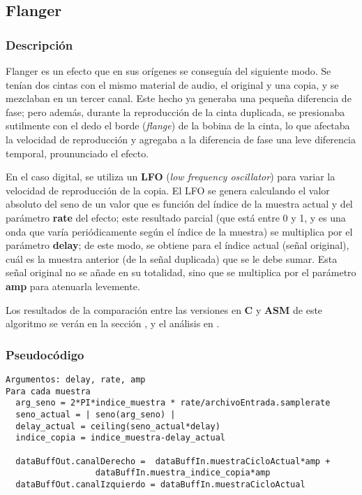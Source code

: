 \subsection{Flanger}
\label{subsec:desarrollo-flanger}

\subsubsection{Descripción}
\label{subsec:desarrollo-flanger-desc}

Flanger es un efecto que en sus orígenes se conseguía del siguiente modo. Se tenían dos cintas con el mismo material de audio, el original y una copia, y se mezclaban en un tercer canal. Este hecho ya generaba una pequeña diferencia de fase; pero además, durante la reproducción de la cinta duplicada, se presionaba sutilmente con el dedo el borde (\textit{flange}) de la bobina de la cinta, lo que afectaba la velocidad de reproducción y agregaba a la diferencia de fase una leve diferencia temporal, proununciado el efecto.

En el caso digital, se utiliza un \textbf{LFO} (\textit{low frequency oscillator}) para variar la velocidad de reproducción de la copia. El LFO se genera calculando el valor absoluto del seno de un valor que es función del índice de la muestra actual y del parámetro \textbf{rate} del efecto; este resultado parcial (que está entre 0 y 1, y es una onda que varía periódicamente según el índice de la muestra) se multiplica por el parámetro  \textbf{delay}; de este modo, se obtiene para el índice actual (señal original), cuál es la muestra anterior (de la señal duplicada) que se le debe sumar. Esta señal original no se añade en su totalidad, sino que se multiplica por el parámetro \textbf{amp} para atenuarla levemente.

\vspace{\baselineskip}

Los resultados de la comparación entre las versiones en \textbf{C} y \textbf{ASM} de este algoritmo se verán en la sección , y el análisis en .

\subsubsection{Pseudocódigo}
\label{subsec:desarrollo-flanger-code}

\lstset{language=C}
\begin{lstlisting}[frame=single]
Argumentos: delay, rate, amp
Para cada muestra
  arg_seno = 2*PI*indice_muestra * rate/archivoEntrada.samplerate
  seno_actual = | seno(arg_seno) |
  delay_actual = ceiling(seno_actual*delay)
  indice_copia = indice_muestra-delay_actual
  
  dataBuffOut.canalDerecho =  dataBuffIn.muestraCicloActual*amp + 
			      dataBuffIn.muestra_indice_copia*amp
  dataBuffOut.canalIzquierdo = dataBuffIn.muestraCicloActual
\end{lstlisting}


